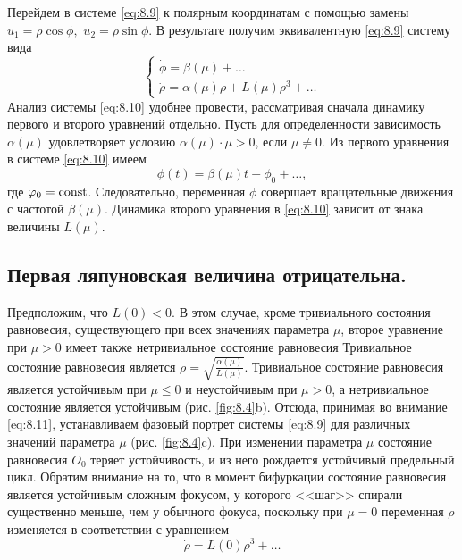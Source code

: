 Перейдем в системе \eqref{eq:8.9} к полярным координатам с помощью замены $u_1 = \rho\cos \phi,$ 
 $u_2=\rho\sin \phi.$ В результате получим эквивалентную \eqref{eq:8.9} систему вида
 \begin{equation}
         \label{eq:8.10}
         \begin{cases}
                 \dot \phi = \beta(\mu) + \dots \\
                 \dot \rho = \alpha(\mu) \rho + L(\mu) \rho^3 + \dots  
         \end{cases}
 \end{equation}
 Анализ системы \eqref{eq:8.10} удобнее провести, рассматривая сначала динамику
первого и второго уравнений отдельно. Пусть для определенности зависимость
$\alpha(\mu)$ удовлетворяет условию $\alpha(\mu) \cdot \mu >0$, если $\mu\neq 0$. Из первого уравнения в
системе \eqref{eq:8.10} имеем
\begin{equation}
        \label{eq:8.11}
        \phi(t) = \beta(\mu) t + \phi_0+\dots,
\end{equation}
где $\varphi_0=\textrm{const}$. Следовательно, переменная $\phi$ совершает вращательные движения с частотой 
$\beta(\mu)$. Динамика второго уравнения в \eqref{eq:8.10} зависит от знака величины $L(\mu)$.

\subsection{Первая ляпуновская величина отрицательна.}%
\label{sub:8.3.1}

Предположим, что $L(0)<0$. В этом случае, кроме тривиального состояния
равновесия, существующего при всех значениях параметра $\mu$, второе уравнение
при $\mu>0$ имеет также нетривиальное состояние равновесия
Тривиальное состояние равновесия является $\rho = \sqrt{ \frac{\alpha(\mu)}{L(\mu)}}.$ 
Тривиальное состояние равновесия является устойчивым при $\mu\leq 0$ и 
неустойчивым при $\mu>0$, а нетривиальное состояние является устойчивым (рис.
\ref{fig:8.4}b). Отсюда, принимая во внимание \eqref{eq:8.11}, устанавливаем фазовый портрет
системы \eqref{eq:8.9} для различных значений параметра $\mu$ (рис. \ref{fig:8.4}c). При изменении
параметра $\mu$ состояние равновесия $O_0$ теряет устойчивость, и из него рождается
устойчивый предельный цикл. Обратим внимание на то, что в момент
бифуркации состояние равновесия является устойчивым сложным фокусом, у
которого <<шаг>> спирали существенно меньше, чем у обычного фокуса,
поскольку при $\mu=0$ переменная $\rho$ изменяется в соответствии с уравнением
\begin{equation}
        \label{eq:}
        \dot \rho = L(0) \rho^3 + \dots
\end{equation}

